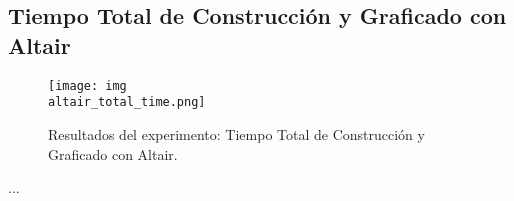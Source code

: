 \subsection{Tiempo Total de Construcción y Graficado con Altair}
\label{exp:altair-total-time}

\begin{figure}[H]
    \centering
    \texttt{[image: img\\altair\_total\_time.png]}
    \caption{Resultados del experimento: Tiempo Total de Construcción y Graficado con Altair.}
    \label{fig:altair-total-time}
\end{figure}

...
